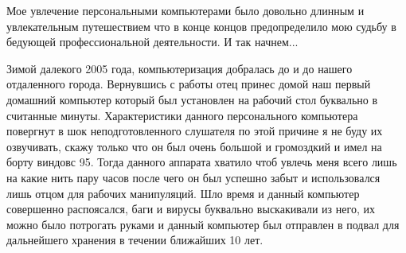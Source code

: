 Мое увлечение персональными компьютерами было довольно длинным и увлекательным путешествием что в конце концов предопределило мою судьбу в бедующей профессиональной деятельности. И так начнем...

Зимой далекого 2005 года, компьютеризация добралась до и до нашего отдаленного города. Вернувшись с работы отец принес домой наш первый домашний компьютер который был установлен на рабочий стол буквально в считанные минуты. Характеристики данного персонального компьютера повергнут в шок неподготовленного слушателя по этой причине я не буду их озвучивать, скажу только что он был очень большой и громоздкий и имел на борту виндовс 95. Тогда данного аппарата хватило чтоб увлечь меня всего лишь на какие нить пару часов после чего он был успешно забыт и использовался лишь отцом для рабочих манипуляций. Шло время и данный компьютер совершенно распоясался, баги и вирусы буквально выскакивали из него, их можно было потрогать руками и данный компьютер был отправлен в подвал для дальнейшего хранения в течении ближайших 10 лет.

